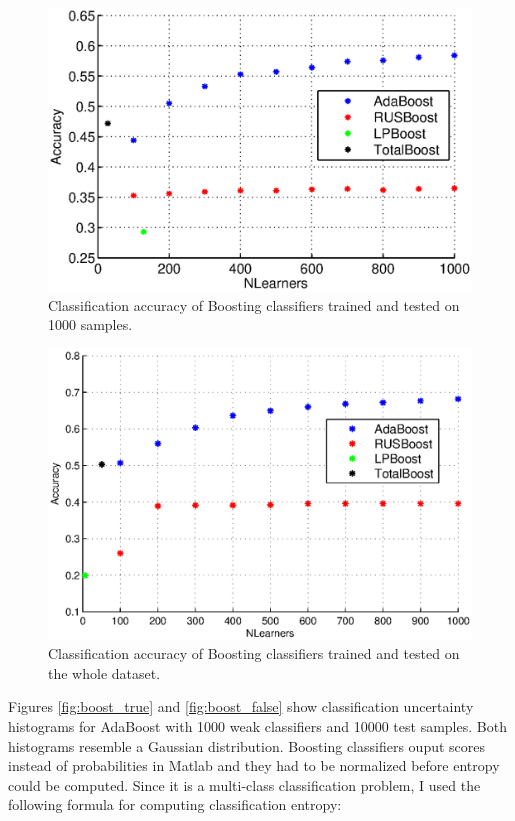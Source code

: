 \documentclass[journal, a4paper]{IEEEtran}
\begin{document}
    \begin{figure}[ht]    
      \centering
      \includegraphics[width=\linewidth]{boost_plot_small}
      \caption{Classification accuracy of Boosting classifiers trained and tested on 1000 samples.}
      \label{fig:boost_accuracy_small}
    \end{figure}
    
    \begin{figure}[ht]    
      \centering
      \includegraphics[width=\linewidth]{boost_plot_big}
      \caption{Classification accuracy of Boosting classifiers trained and tested on the whole dataset.}
      \label{fig:boost_accuracy_big}
    \end{figure}
    
    Figures \ref{fig:boost_true} and \ref{fig:boost_false} show classification uncertainty histograms for AdaBoost with 1000 weak classifiers and 10000 test samples. Both histograms resemble a Gaussian distribution. Boosting classifiers ouput scores instead of probabilities in Matlab and they had to be normalized before entropy could be computed. Since it is a multi-class classification problem, I used the following formula for computing classification entropy:
    
\end{document}
